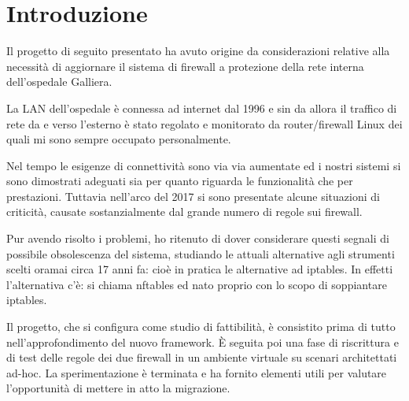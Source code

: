 

\chapter{Introduzione} %

\label{Chapter1} %


\newcommand{\keyword}[1]{\textbf{#1}}
\newcommand{\tabhead}[1]{\textbf{#1}}
\newcommand{\code}[1]{\texttt{#1}}
\newcommand{\file}[1]{\texttt{\bfseries#1}}
\newcommand{\option}[1]{\texttt{\itshape#1}}


Il progetto di seguito presentato ha avuto origine da considerazioni
relative alla necessit\`a di aggiornare il sistema di firewall a protezione
della rete interna dell'ospedale Galliera.

La LAN dell'ospedale \`e connessa ad internet dal 1996 e sin da allora il
traffico di rete da e verso l'esterno \`e stato regolato e monitorato da
router/firewall Linux dei quali mi sono sempre occupato personalmente.

Nel tempo le esigenze di connettivit\`a sono via via aumentate ed i nostri
sistemi si sono dimostrati adeguati sia per quanto riguarda le funzionalit\`a
che per prestazioni.
Tuttavia nell'arco del 2017 si sono presentate alcune situazioni di
criticit\`a, causate sostanzialmente dal grande numero di regole sui firewall.

Pur avendo risolto i problemi, ho ritenuto di dover considerare questi segnali
di possibile obsolescenza del sistema, studiando le attuali alternative agli
strumenti scelti oramai circa 17 anni fa: cio\`e in pratica le alternative ad
iptables.  In effetti l'alternativa c'\`e: si chiama nftables ed nato proprio
con lo scopo di soppiantare iptables.

Il progetto, che si configura come studio di fattibilit\`a, \`e consistito
prima di tutto nell'approfondimento del nuovo framework. \`E seguita poi una
fase di riscrittura e di test delle regole dei due firewall in un ambiente
virtuale su scenari architettati ad-hoc. La sperimentazione \`e terminata e ha
fornito elementi utili per valutare l'opportunit\`a di mettere in atto la
migrazione. 

